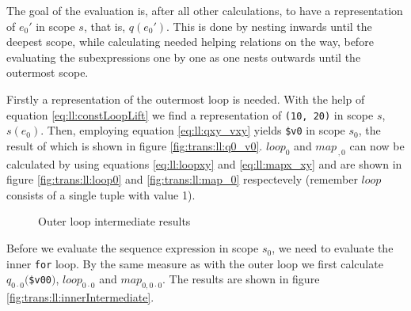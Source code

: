 The goal of the evaluation is, after all other calculations, to have a representation of $e_{0}'$ in scope $s$,
that is, $q(e_{0}')$. This is done by nesting inwards until the deepest scope, while calculating needed helping
relations on the way, before evaluating the subexpressions one by one as one nests outwards until the outermost
scope.

Firstly a representation of the outermost loop is needed. With the help of equation \ref{eq:ll:constLoopLift} we
find a representation of \texttt{(10, 20)} in scope $s$, $s(e_{0})$. Then, employing equation \ref{eq:ll:qxy_vxy}
yields \texttt{\$v0} in scope $s_{0}$, the result of which is shown in figure \ref{fig:trans:ll:q0_v0}.
$loop_{0}$ and $map_{\, ,0}$ can now be calculated by using equations \ref{eq:ll:loopxy} and \ref{eq:ll:mapx_xy}
and are shown in figure \ref{fig:trans:ll:loop0} and \ref{fig:trans:ll:map_0} respectevely (remember
$loop$ consists of a single tuple with value 1).

\begin{figure}[!h]
\centering
{}
\qquad \quad
{}
\qquad \quad
{}
\label{fig:trans:ll:outerIntermediate}
\caption{Outer loop intermediate results}
\end{figure}

Before we evaluate the sequence expression in scope $s_0$, we need to evaluate the inner \texttt{for} loop. By the
same measure as with the outer loop we first calculate $q_{0\cdot 0}($\texttt{\$v00}$)$, $loop_{0 \cdot 0}$ and
$map_{0, 0 \cdot 0}$. The results are shown in figure \ref{fig:trans:ll:innerIntermediate}.

